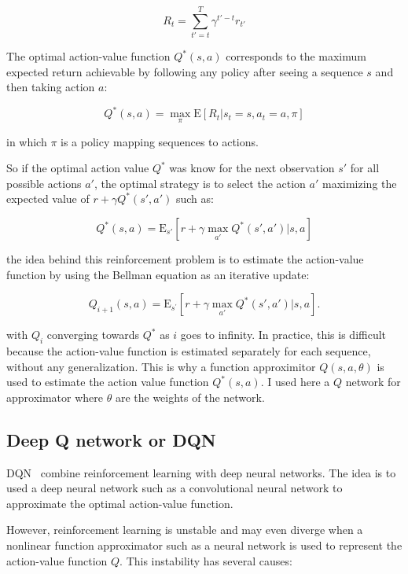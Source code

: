 \documentclass[12pt]{article}
\begin{document}
\begin{equation} 
	R_{t}=\sum_{t'=t}^T \gamma^{t'-t}r_{t'}
\end{equation} 

The optimal action-value function $Q^*(s,a)$ corresponds to the maximum expected return achievable by following any policy after seeing a sequence $s$ and then taking action $a$:

\begin{equation} 
 	Q^*(s,a)=\max_{\pi}\mathrm{E}[R_{t}|s_{t}=s,a_{t}=a,\pi]
\end{equation} 

in which $\pi$ is a policy mapping sequences to actions.

So if the optimal action value $Q^*$ was know for the next observation $s'$ for all possible actions $a'$, the optimal strategy is to select the action $a'$ maximizing the expected value of $r + \gamma Q^*(s',a')$ such as:

\begin{equation} 
 	Q^*(s,a)=\mathrm{E}_{s'}[r + \gamma \max_{a'} Q^*(s',a')|s,a]
\end{equation} 
 
the idea behind this reinforcement problem is to estimate the action-value function by using the Bellman equation as an iterative update:

\begin{equation}
	Q_{i+1}(s,a)=\mathrm{E}_{s^{'}} [r + \gamma \max_{a'} Q^{*}(s',a')|s,a].
\end{equation}

with $Q_{i}$ converging towards $Q^*$ as $i$ goes to infinity. In practice, this is difficult because the action-value function is estimated separately for each sequence, without any generalization. 
This is why a function approximitor $Q(s,a,\theta)$ is used to estimate the action value function $Q^*(s,a)$. 
I used here a $Q$ network for approximator where $\theta$ are the weights of the network.


\subsection{Deep Q network or DQN}
DQN~\cite{mnih2015humanlevel} combine reinforcement learning with deep neural networks. 
The idea is to used a deep neural network such as a convolutional neural network to approximate the optimal action-value function.
 
However, reinforcement learning is unstable and may even diverge when a nonlinear function approximator such as a neural network is used to represent the action-value function $Q$.
This instability has several causes:
\end{document}
